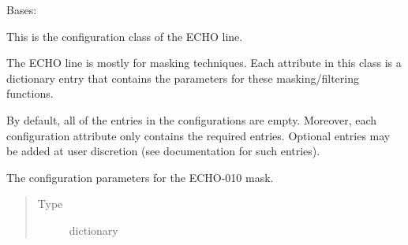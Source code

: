 \documentclass[letterpaper,10pt,english]{sphinxmanual}
\begin{document}
\begin{fulllineitems}
\label{\detokenize{python_docstrings/IfA_Smeargle.yankee.configuration_classes.EchoConfig_file:IfA_Smeargle.yankee.configuration_classes.EchoConfig_file.EchoConfig}}
Bases: {\hyperref[\detokenize{python_docstrings/IfA_Smeargle.yankee.configuration_classes.BaseConfig_file:IfA_Smeargle.yankee.configuration_classes.BaseConfig_file.BaseConfig}]{}}

This is the configuration class of the ECHO line.

The ECHO line is mostly for masking techniques. Each attribute in this
class is a dictionary entry that contains the parameters for these
masking/filtering functions.

By default, all of the entries in the configurations are empty.
Moreover, each configuration attribute only contains the required
entries. Optional entries may be added at user discretion (see
documentation for such entries).

\begin{fulllineitems}
\label{\detokenize{python_docstrings/IfA_Smeargle.yankee.configuration_classes.EchoConfig_file:IfA_Smeargle.yankee.configuration_classes.EchoConfig_file.EchoConfig.echo010_config}}
The configuration parameters for the ECHO-010 mask.
\begin{quote}\begin{description}
\item[{Type}] \leavevmode
dictionary

\end{description}\end{quote}

\end{fulllineitems}



\end{fulllineitems}
\end{document}
